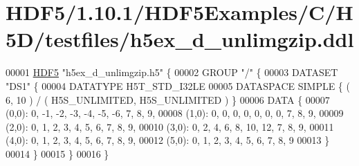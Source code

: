 \hypertarget{_h_d_f5_21_810_81_2_h_d_f5_examples_2_c_2_h5_d_2testfiles_2h5ex__d__unlimgzip_8ddl_source}{}\section{H\+D\+F5/1.10.1/\+H\+D\+F5\+Examples/\+C/\+H5\+D/testfiles/h5ex\+\_\+d\+\_\+unlimgzip.ddl}
\label{_h_d_f5_21_810_81_2_h_d_f5_examples_2_c_2_h5_d_2testfiles_2h5ex__d__unlimgzip_8ddl_source}

\begin{DoxyCode}
00001 \hyperlink{namespace_h_d_f5}{HDF5} \textcolor{stringliteral}{"h5ex\_d\_unlimgzip.h5"} \{
00002 GROUP \textcolor{stringliteral}{"/"} \{
00003    DATASET \textcolor{stringliteral}{"DS1"} \{
00004       DATATYPE  H5T\_STD\_I32LE
00005       DATASPACE  SIMPLE \{ ( 6, 10 ) / ( H5S\_UNLIMITED, H5S\_UNLIMITED ) \}
00006       DATA \{
00007       (0,0): 0, -1, -2, -3, -4, -5, -6, 7, 8, 9,
00008       (1,0): 0, 0, 0, 0, 0, 0, 0, 7, 8, 9,
00009       (2,0): 0, 1, 2, 3, 4, 5, 6, 7, 8, 9,
00010       (3,0): 0, 2, 4, 6, 8, 10, 12, 7, 8, 9,
00011       (4,0): 0, 1, 2, 3, 4, 5, 6, 7, 8, 9,
00012       (5,0): 0, 1, 2, 3, 4, 5, 6, 7, 8, 9
00013       \}
00014    \}
00015 \}
00016 \}
\end{DoxyCode}
